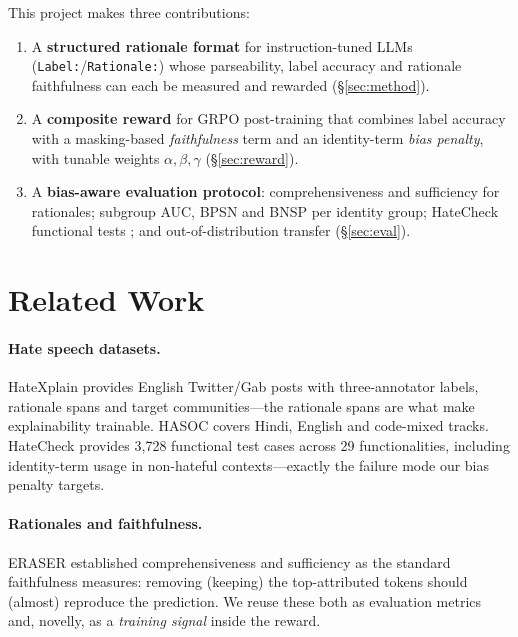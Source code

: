 \documentclass[11pt]{article}
\begin{document}
This project makes three contributions:
\begin{enumerate}
  \item A \textbf{structured rationale format} for instruction-tuned LLMs
  (\texttt{Label:}/\texttt{Rationale:}) whose parseability, label accuracy
  and rationale faithfulness can each be measured and rewarded
  (\S\ref{sec:method}).
  \item A \textbf{composite reward} for GRPO post-training that combines
  label accuracy with a masking-based \emph{faithfulness} term and an
  identity-term \emph{bias penalty}, with tunable weights
  $\alpha,\beta,\gamma$ (\S\ref{sec:reward}).
  \item A \textbf{bias-aware evaluation protocol}: comprehensiveness and
  sufficiency for rationales; subgroup AUC, BPSN and BNSP
  \citep{borkan2019nuanced} per identity group; HateCheck functional tests
  \citep{vidgen2021hatecheck}; and out-of-distribution transfer
  (\S\ref{sec:eval}).
\end{enumerate}


\section{Related Work}
\paragraph{Hate speech datasets.} HateXplain \citep{mathew2020hatexplain}
provides English Twitter/Gab posts with three-annotator labels, rationale
spans and target communities---the rationale spans are what make
explainability trainable. HASOC \citep{mandl2020hasoc} covers Hindi,
English and code-mixed tracks. HateCheck \citep{vidgen2021hatecheck}
provides 3{,}728 functional test cases across 29 functionalities, including
identity-term usage in non-hateful contexts---exactly the failure mode our
bias penalty targets.

\paragraph{Rationales and faithfulness.} ERASER \citep{deyoung2020eraser}
established comprehensiveness and sufficiency as the standard faithfulness
measures: removing (keeping) the top-attributed tokens should (almost)
reproduce the prediction. We reuse these both as evaluation metrics and,
novelly, as a \emph{training signal} inside the reward.
\end{document}
